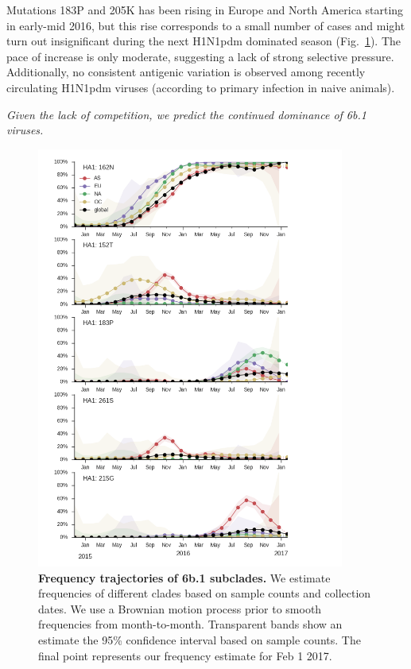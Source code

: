 \documentclass[11pt,oneside,letterpaper]{article}
\begin{document}
Mutations 183P and 205K has been rising in Europe and North America starting in early-mid 2016, but this rise corresponds to a small number of cases and might turn out insignificant during the next H1N1pdm dominated season (Fig.\ \ref{H1N1pdm_mutations}). The pace of increase is only moderate, suggesting a lack of strong selective pressure. Additionally, no consistent antigenic variation is observed among recently circulating H1N1pdm viruses (according to primary infection in naive animals).

\textit{Given the lack of competition, we predict the continued dominance of 6b.1 viruses.}

\pagebreak

\begin{figure}[H]
	\centering
	\includegraphics[width=0.9\textwidth]{../figures/feb-2017/h1n1pdm_frequencies.png}
	\caption{\textbf{Frequency trajectories of 6b.1 subclades.}
	We estimate frequencies of different clades based on sample counts and collection dates.
	We use a Brownian motion process prior to smooth frequencies from month-to-month.
	Transparent bands show an estimate the 95\% confidence interval based on sample counts.
	The final point represents our frequency estimate for Feb 1 2017.
	}
	\label{H1N1pdm_mutations}
\end{figure}
\end{document}
